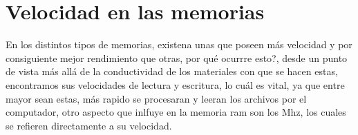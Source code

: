 \documentclass{article}
\begin{document}
\section{Velocidad en las memorias} 
En los distintos tipos de memorias, existena unas que poseen más velocidad y por consiguiente mejor rendimiento que otras, por qué ocurrre esto?, desde un punto de vista más allá de la conductividad de los materiales con que se hacen estas, encontramos sus velocidades de lectura y escritura, lo cuál es vital, ya que entre mayor sean estas, más rapido se procesaran y leeran los archivos por el computador, otro aspecto que inlfuye en la memoria ram son los Mhz, los cuales se refieren directamente a su velocidad.




\end{document}
